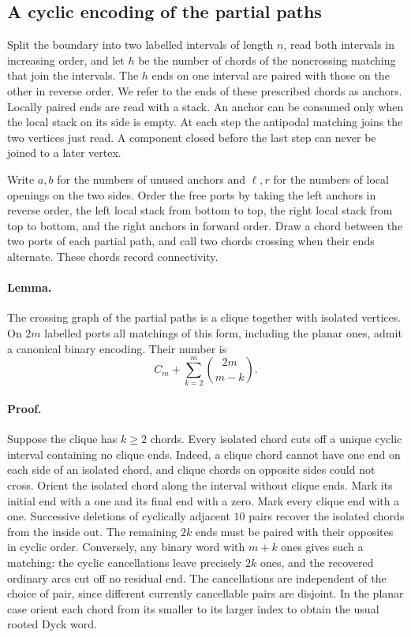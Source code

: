 \subsection{A cyclic encoding of the partial paths}
\label{sec:projective-word}

Split the boundary into two labelled intervals of length \(n\), read both
intervals in increasing order, and let \(h\) be the number of chords of the
noncrossing matching that join the intervals. The \(h\) ends on one interval
are paired with those on the other in reverse order. We refer to the ends of
these prescribed chords as anchors. Locally paired ends are read with a stack.
An anchor can be consumed only when the local stack on its side is empty.
At each step the antipodal matching joins the two vertices just read. A
component closed before the last step can never be joined to a later vertex.

Write \(a,b\) for the numbers of unused anchors and \(\ell,r\) for the
numbers of local openings on the two sides. Order the free ports by taking the
left anchors in reverse order, the left local stack from bottom to top, the
right local stack from top to bottom, and the right anchors in forward order.
Draw a chord between the two ports of each partial path, and call two chords
crossing when their ends alternate. These chords record connectivity.

\paragraph{Lemma.}
The crossing graph of the partial paths is a clique together with isolated
vertices. On \(2m\) labelled ports all matchings of this form, including the
planar ones, admit a canonical binary encoding. Their number is
\[
 C_m+\sum_{k=2}^{m}\binom{2m}{m-k}.
\]

\paragraph{Proof.}
Suppose the clique has \(k\ge2\) chords. Every isolated chord cuts off a
unique cyclic interval containing no clique ends. Indeed, a clique chord
cannot have one end on each side of an isolated chord, and clique chords on
opposite sides could not cross. Orient the isolated chord along the interval
without clique ends. Mark its initial end with a one and its final end with a
zero. Mark every clique end with a one. Successive deletions of cyclically
adjacent \(10\) pairs recover the isolated chords from the inside out. The
remaining \(2k\) ends must be paired with their opposites in cyclic order.
Conversely, any binary word with \(m+k\) ones gives such a matching: the
cyclic cancellations leave precisely \(2k\) ones, and the recovered ordinary
arcs cut off no residual end. The cancellations are independent of the choice
of pair, since different currently cancellable pairs are disjoint. In the
planar case orient each chord from its smaller to its larger index to obtain
the usual rooted Dyck word.

